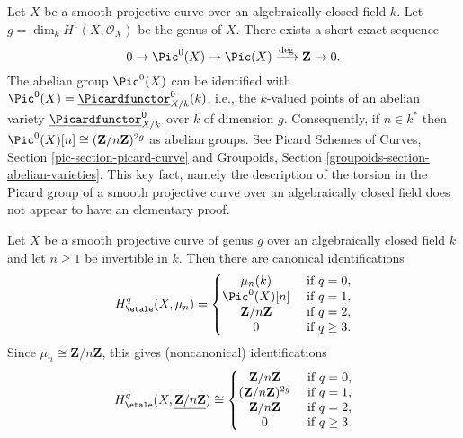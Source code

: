 \medskip\noindent
Let $X$ be a smooth projective curve over an algebraically closed field $k$.
Let $g = \dim_k H^1(X, \mathcal{O}_X)$ be the genus of $X$.
There exists a short exact sequence
$$
0 \to \Pic^0(X) \to \Pic(X) \xrightarrow{\deg} \mathbf{Z} \to 0.
$$
The abelian group $\Pic^0(X)$ can be identified with
$\Pic^0(X) = \underline{\Picardfunctor}^0_{X/k}(k)$, i.e.,
the $k$-valued points of an abelian variety
$\underline{\Picardfunctor}^0_{X/k}$ over $k$ of dimension $g$.
Consequently, if $n \in k^*$ then
$\Pic^0(X)[n] \cong (\mathbf{Z}/n\mathbf{Z})^{2g}$
as abelian groups. See
Picard Schemes of Curves, Section \ref{pic-section-picard-curve}
and
Groupoids, Section \ref{groupoids-section-abelian-varieties}.
This key fact, namely the description of the torsion in the
Picard group of a smooth projective curve over an algebraically
closed field does not appear to have an elementary proof.

\begin{lemma}
\label{lemma-cohomology-smooth-projective-curve}
Let $X$ be a smooth projective curve of genus $g$ over an
algebraically closed field $k$ and let $n \geq 1$ be invertible in $k$.
Then there are canonical identifications
$$
H_\etale^q(X, \mu_n) =
\left\{
\begin{matrix}
\mu_n(k) & \text{ if }q = 0, \\
\Pic^0(X)[n] & \text{ if }q = 1, \\
\mathbf{Z}/n\mathbf{Z} & \text{ if }q = 2, \\
0 & \text{ if }q \geq 3.
\end{matrix}
\right.
$$
Since $\mu_n \cong \underline{\mathbf{Z}/n\mathbf{Z}}$, this gives
(noncanonical) identifications
$$
H_\etale^q(X, \underline{\mathbf{Z}/n\mathbf{Z}}) \cong
\left\{
\begin{matrix}
\mathbf{Z}/n\mathbf{Z} & \text{ if }q = 0, \\
(\mathbf{Z}/n\mathbf{Z})^{2g} & \text{ if }q = 1, \\
\mathbf{Z}/n\mathbf{Z} & \text{ if }q = 2, \\
0 & \text{ if }q \geq 3.
\end{matrix}
\right.
$$
\end{lemma}

